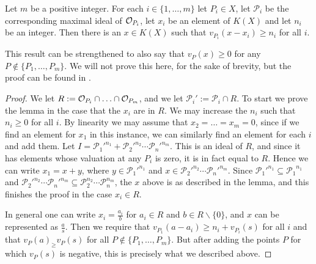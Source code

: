 \begin{lem}\label{approximationlemma}
Let $m$ be a positive integer. 
For each $i\in \{1,\ldots, m\}$ let $P_i\in X$, let $\mathcal{P}_i$ be the corresponding maximal ideal of ${\cal O}_{P_i}$, let $x_i$ be an element of $K(X)$ and let $n_i$ be an integer.
Then there is an $x\in K(X)$ such that $v_{P_i}(x-x_i) \geq n_i$ for all $i$.
\end{lem}

\begin{rem}
This result can be strengthened to also say that $v_P(x) \geq 0$ for any $P\notin \{P_1,\ldots ,P_m\}$.
We will not prove this here, for the sake of brevity, but the proof can be found in \cite[Ch. 1, \S 3]{localfields}.
\end{rem}
\begin{proof}
We let $R:= {\cal O}_{P_i} \cap \ldots \cap {\cal O}_{P_m}$, and we let $\mathcal{P}_i' := \mathcal{P}_i \cap R$.
To start we prove the lemma in the case that the $x_i$ are in $R$.
 We may increase the $n_i$ such that $n_i\geq 0$ for all $i$.
 By linearity we may assume that $x_2 = \ldots = x_m = 0$, since if we find an element for $x_1$ in this instance, we can similarly find an element for each $i$ and add them.
Let $I = {\mathcal{P}_1'}^{n_1} + {\mathcal{P}_2'}^{n_2}\cdots {\mathcal{P}_n'}^{n_m}$.
This is an ideal of $R$, and since it has elements whose valuation at any $P_i$ is zero, it is in fact equal to $R$.
Hence we can write $x_1 = x + y$, where $y \in {\mathcal{P}_1'}^{n_1}$ and $x\in {\mathcal{P}_2'}^{n_2}\cdots {\mathcal{P}_n'}^{n_m}$.
Since ${\mathcal{P}_1'}^{n_1} \subseteq {\mathcal{P}_1}^{n_1}$ and ${\mathcal{P}_2'}^{n_2}\cdots {\mathcal{P}_n'}^{n_m} \subseteq \mathcal{P}_2^{n_2}\cdots \mathcal{P}_n^{n_m}$, the $x$ above is as described in the lemma, and this finishes the proof in the case $x_i \in R$.

 
 In general one can write $x_i = \frac{a_i}{b}$ for $a_i\in R$ and $b\in R\backslash \{0\}$, and $x$ can be represented as $\frac{a}{s}$.
 Then we require that $v_{P_1}(a-a_i) \geq n_i + v_{P_i}(s)$ for all $i$ and that $v_P(a)_ \geq v_P(s)$ for all $P\notin \{P_1,\ldots ,P_m\}$.
 But after adding the points $P$ for which $v_P(s)$ is negative, this is precisely what we described above.
\end{proof}

